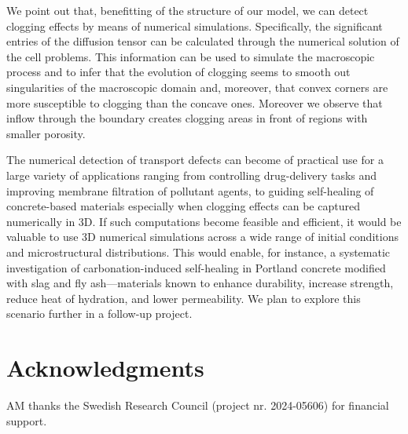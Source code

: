 \documentclass[reqno, 11pt]{amsart}
\numberwithin{equation}{section}
\begin{document}
We point out that, benefitting of the structure of our model,  we can detect clogging effects by means of numerical simulations.
Specifically,  the significant entries of the diffusion tensor can be calculated through the numerical solution of the cell problems. This information can be used to simulate  the macroscopic process and to infer that the evolution of clogging seems to smooth out  singularities of the macroscopic domain and, moreover, that convex corners are more susceptible to clogging than the concave ones. Moreover we observe that inflow through the boundary creates clogging areas in front of regions with smaller porosity.

The numerical detection of transport defects can become of practical use for a large variety of applications  ranging from controlling drug-delivery tasks and improving membrane filtration of pollutant agents,  to guiding self-healing of concrete-based materials especially when clogging effects can be captured numerically in 3D. 
If such computations become feasible and efficient, it would be valuable to use 3D numerical simulations across a wide range of initial conditions and microstructural distributions. This would enable, for instance, a systematic investigation of carbonation-induced self-healing in Portland concrete modified with slag and fly ash—materials known to enhance durability, increase strength, reduce heat of hydration, and lower permeability. We plan to explore this scenario further in a follow-up project.

\section*{Acknowledgments}
AM thanks the Swedish Research Council (project nr. 2024-05606)  for financial support. 











%
%

%
\end{document}
